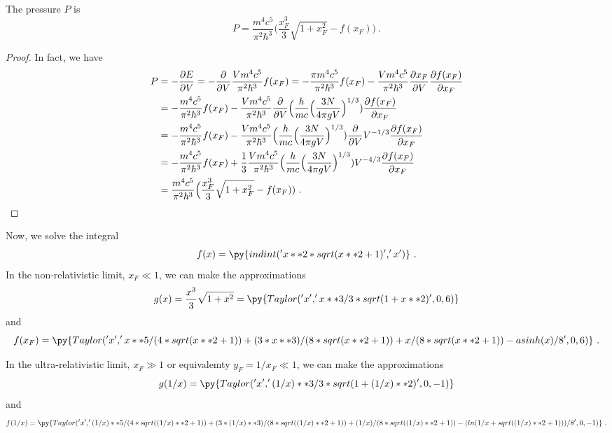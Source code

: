     The pressure $P$ is 
    \begin{equation*}
        P = \frac{m^4 c^5}{\pi^2 \hbar^3} \Big (\frac{x_F^3}{3} \sqrt{1 + x_F^2} - f(x_F)) ~.
    \end{equation*}
    \begin{proof}
        In fact, we have
        \begin{equation*}
        \begin{aligned}
            P & = - \frac{\partial E}{\partial V} = - \frac{\partial}{\partial V} \frac{ V m^4 c^5}{\pi^2 \hbar^3} f(x_F) = - \frac{\pi m^4 c^5}{\pi^2 \hbar^3} f(x_F) - \frac{ V m^4 c^5}{\pi^2 \hbar^3} \frac{\partial x_F}{\partial V} \frac{\partial f(x_F)}{\partial x_F} \\ & = - \frac{ m^4 c^5}{\pi^2 \hbar^3} f(x_F) - \frac{ V m^4 c^5}{\pi^2 \hbar^3} \frac{\partial}{\partial V} \Big (\frac{h}{mc} \Big ( \frac{3 N}{4 \pi g V} \Big)^{1/3}) \frac{\partial f(x_F)}{\partial x_F} \\ & = - \frac{m^4 c^5}{\pi^2 \hbar^3} f(x_F) - \frac{V m^4 c^5}{\pi^2 \hbar^3} \Big (\frac{h}{mc} \Big ( \frac{3 N}{4 \pi g V} \Big)^{1/3}) \frac{\partial}{\partial V} V^{-1/3} \frac{\partial f(x_F)}{\partial x_F} \\ & = - \frac{m^4 c^5}{\pi^2 \hbar^3} f(x_F) + \frac{1}{3} \frac{V m^4 c^5}{\pi^2 \hbar^3} \Big (\frac{h}{mc} \Big ( \frac{3 N}{4 \pi g V} \Big)^{1/3}) V^{-4/3} \frac{\partial f(x_F)}{\partial x_F} \\ & = \frac{m^4 c^5}{\pi^2 \hbar^3} \Big (\frac{x_F^3}{3} \sqrt{1 + x_F^2} - f(x_F)) ~.
        \end{aligned}
        \end{equation*}
    \end{proof}

    Now, we solve the integral 
    \begin{equation*}
        f(x) = \py{indint('x**2 * sqrt(x**2 + 1)', 'x')} ~.
    \end{equation*}
    In the non-relativistic limit, $x_F \ll 1$, we can make the approximations 
    \begin{equation*}
        g(x) = \frac{x^3}{3} \sqrt{1 + x^2} = \py{Taylor('x', 'x**3 / 3 * sqrt(1 + x**2)', 0, 6)}
    \end{equation*}
    and 
    \begin{equation*}
        f(x_F) = \py{Taylor('x', 'x**5 / (4 * sqrt(x**2 + 1)) + ( 3 * x**3) / (8 * sqrt(x**2 + 1)) + x / (8 * sqrt(x**2 + 1)) - asinh(x) / 8', 0, 6)} ~.
    \end{equation*}

    In the ultra-relativistic limit, $x_F \gg 1$ or equivalemty $y_F = 1 / x_F \ll 1$, we can make the approximations 
    \begin{equation*}
        g(1/x) = \py{Taylor('x', '(1 / x)**3 / 3 * sqrt(1 + (1 / x)**2)', 0, -1)}
    \end{equation*}
    and 
    \begin{equation*}
        f(1 / x) = \py{Taylor('x', '(1 / x)**5 / (4 * sqrt((1 / x)**2 + 1)) + ( 3 * (1 / x)**3) / (8 * sqrt((1 / x)**2 + 1)) + (1 / x) / (8 * sqrt((1 / x)**2 + 1)) - (ln ( 1 / x + sqrt((1/x)**2 + 1))) / 8', 0, -1)} ~.
    \end{equation*}
    
